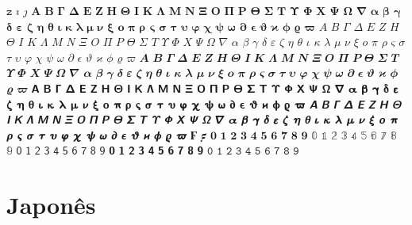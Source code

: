 $𝚣$ 
$𝚤$ 
$𝚥$ 
$𝚨$ 
$𝚩$ 
$𝚪$ 
$𝚫$ 
$𝚬$ 
$𝚭$ 
$𝚮$ 
$𝚯$ 
$𝚰$ 
$𝚱$ 
$𝚲$ 
$𝚳$ 
$𝚴$ 
$𝚵$ 
$𝚶$ 
$𝚷$ 
$𝚸$ 
$𝚹$ 
$𝚺$ 
$𝚻$ 
$𝚼$ 
$𝚽$ 
$𝚾$ 
$𝚿$ 
$𝛀$ 
$𝛁$ 
$𝛂$ 
$𝛃$ 
$𝛄$ 
$𝛅$ 
$𝛆$ 
$𝛇$ 
$𝛈$ 
$𝛉$ 
$𝛊$ 
$𝛋$ 
$𝛌$ 
$𝛍$ 
$𝛎$ 
$𝛏$ 
$𝛐$ 
$𝛑$ 
$𝛒$ 
$𝛓$ 
$𝛔$ 
$𝛕$ 
$𝛖$ 
$𝛗$ 
$𝛘$ 
$𝛙$ 
$𝛚$ 
$𝛛$ 
$𝛜$ 
$𝛝$ 
$𝛞$ 
$𝛟$ 
$𝛠$ 
$𝛡$ 
$𝛢$ 
$𝛣$ 
$𝛤$ 
$𝛥$ 
$𝛦$ 
$𝛧$ 
$𝛨$ 
$𝛩$ 
$𝛪$ 
$𝛫$ 
$𝛬$ 
$𝛭$ 
$𝛮$ 
$𝛯$ 
$𝛰$ 
$𝛱$ 
$𝛲$ 
$𝛳$ 
$𝛴$ 
$𝛵$ 
$𝛶$ 
$𝛷$ 
$𝛸$ 
$𝛹$ 
$𝛺$ 
$𝛻$ 
$𝛼$ 
$𝛽$ 
$𝛾$ 
$𝛿$ 
$𝜀$ 
$𝜁$ 
$𝜂$ 
$𝜃$ 
$𝜄$ 
$𝜅$ 
$𝜆$ 
$𝜇$ 
$𝜈$ 
$𝜉$ 
$𝜊$ 
$𝜋$ 
$𝜌$ 
$𝜍$ 
$𝜎$ 
$𝜏$ 
$𝜐$ 
$𝜑$ 
$𝜒$ 
$𝜓$ 
$𝜔$ 
$𝜕$ 
$𝜖$ 
$𝜗$ 
$𝜘$ 
$𝜙$ 
$𝜚$ 
$𝜛$ 
$𝜜$ 
$𝜝$ 
$𝜞$ 
$𝜟$ 
$𝜠$ 
$𝜡$ 
$𝜢$ 
$𝜣$ 
$𝜤$ 
$𝜥$ 
$𝜦$ 
$𝜧$ 
$𝜨$ 
$𝜩$ 
$𝜪$ 
$𝜫$ 
$𝜬$ 
$𝜭$ 
$𝜮$ 
$𝜯$ 
$𝜰$ 
$𝜱$ 
$𝜲$ 
$𝜳$ 
$𝜴$ 
$𝜵$ 
$𝜶$ 
$𝜷$ 
$𝜸$ 
$𝜹$ 
$𝜺$ 
$𝜻$ 
$𝜼$ 
$𝜽$ 
$𝜾$ 
$𝜿$ 
$𝝀$ 
$𝝁$ 
$𝝂$ 
$𝝃$ 
$𝝄$ 
$𝝅$ 
$𝝆$ 
$𝝇$ 
$𝝈$ 
$𝝉$ 
$𝝊$ 
$𝝋$ 
$𝝌$ 
$𝝍$ 
$𝝎$ 
$𝝏$ 
$𝝐$ 
$𝝑$ 
$𝝒$ 
$𝝓$ 
$𝝔$ 
$𝝕$ 
$𝝖$ 
$𝝗$ 
$𝝘$ 
$𝝙$ 
$𝝚$ 
$𝝛$ 
$𝝜$ 
$𝝝$ 
$𝝞$ 
$𝝟$ 
$𝝠$ 
$𝝡$ 
$𝝢$ 
$𝝣$ 
$𝝤$ 
$𝝥$ 
$𝝦$ 
$𝝧$ 
$𝝨$ 
$𝝩$ 
$𝝪$ 
$𝝫$ 
$𝝬$ 
$𝝭$ 
$𝝮$ 
$𝝯$ 
$𝝰$ 
$𝝱$ 
$𝝲$ 
$𝝳$ 
$𝝴$ 
$𝝵$ 
$𝝶$ 
$𝝷$ 
$𝝸$ 
$𝝹$ 
$𝝺$ 
$𝝻$ 
$𝝼$ 
$𝝽$ 
$𝝾$ 
$𝝿$ 
$𝞀$ 
$𝞁$ 
$𝞂$ 
$𝞃$ 
$𝞄$ 
$𝞅$ 
$𝞆$ 
$𝞇$ 
$𝞈$ 
$𝞉$ 
$𝞊$ 
$𝞋$ 
$𝞌$ 
$𝞍$ 
$𝞎$ 
$𝞏$ 
$𝞐$ 
$𝞑$ 
$𝞒$ 
$𝞓$ 
$𝞔$ 
$𝞕$ 
$𝞖$ 
$𝞗$ 
$𝞘$ 
$𝞙$ 
$𝞚$ 
$𝞛$ 
$𝞜$ 
$𝞝$ 
$𝞞$ 
$𝞟$ 
$𝞠$ 
$𝞡$ 
$𝞢$ 
$𝞣$ 
$𝞤$ 
$𝞥$ 
$𝞦$ 
$𝞧$ 
$𝞨$ 
$𝞩$ 
$𝞪$ 
$𝞫$ 
$𝞬$ 
$𝞭$ 
$𝞮$ 
$𝞯$ 
$𝞰$ 
$𝞱$ 
$𝞲$ 
$𝞳$ 
$𝞴$ 
$𝞵$ 
$𝞶$ 
$𝞷$ 
$𝞸$ 
$𝞹$ 
$𝞺$ 
$𝞻$ 
$𝞼$ 
$𝞽$ 
$𝞾$ 
$𝞿$ 
$𝟀$ 
$𝟁$ 
$𝟂$ 
$𝟃$ 
$𝟄$ 
$𝟅$ 
$𝟆$ 
$𝟇$ 
$𝟈$ 
$𝟉$ 
$𝟊$ 
$𝟋$ 
$𝟎$ 
$𝟏$ 
$𝟐$ 
$𝟑$ 
$𝟒$ 
$𝟓$ 
$𝟔$ 
$𝟕$ 
$𝟖$ 
$𝟗$ 
$𝟘$ 
$𝟙$ 
$𝟚$ 
$𝟛$ 
$𝟜$ 
$𝟝$ 
$𝟞$ 
$𝟟$ 
$𝟠$ 
$𝟡$ 
$𝟢$ 
$𝟣$ 
$𝟤$ 
$𝟥$ 
$𝟦$ 
$𝟧$ 
$𝟨$ 
$𝟩$ 
$𝟪$ 
$𝟫$ 
$𝟬$ 
$𝟭$ 
$𝟮$ 
$𝟯$ 
$𝟰$ 
$𝟱$ 
$𝟲$ 
$𝟳$ 
$𝟴$ 
$𝟵$ 
$𝟶$ 
$𝟷$ 
$𝟸$ 
$𝟹$ 
$𝟺$ 
$𝟻$ 
$𝟼$ 
$𝟽$ 
$𝟾$ 
$𝟿$ \section*{Japonês}
\par{}\protect{}
